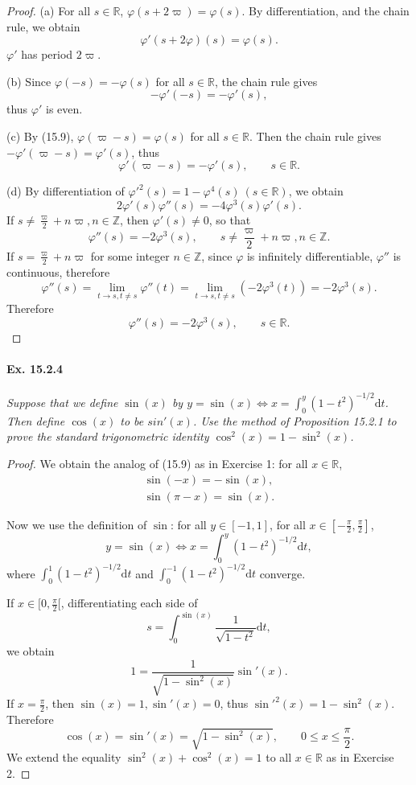 \documentclass[11pt,a4paper]{article}
\newcommand{\D}{\mathrm{d}}
\newcommand{\Z}{\mathbb{Z}}
\newcommand{\R}{\mathbb{R}}
\begin{document}
\begin{proof}
\item[(a)] For all $s \in \R$, $\varphi(s +2 \varpi) = \varphi(s)$. By differentiation, and the chain rule,  we obtain
$$\varphi'(s + 2 \varphi)(s)= \varphi(s).$$
$\varphi'$ has period $2 \varpi$.
\item[(b)] Since $\varphi(-s) = - \varphi(s)$ for all $s \in \R$, the chain rule gives
$$- \varphi'(-s) = - \varphi'(s),$$
thus $\varphi'$ is even.
\item[(c)] By (15.9), $\varphi(\varpi - s) = \varphi(s)$ for all $s \in \R$. Then the chain rule gives $-\varphi'(\varpi -s) = \varphi'(s)$, thus
$$\varphi'(\varpi -s) = -\varphi'(s),\qquad s \in \R.$$
\item[(d)] By differentiation of $\varphi'^2(s) = 1 - \varphi^4(s)\ (s \in \R)$, we obtain
$$2 \varphi'(s) \varphi''(s) = -4 \varphi^3(s) \varphi'(s).$$
If $s \ne \frac{\varpi}{2} + n \varpi, n \in \Z$, then $\varphi'(s) \ne 0$, so that
$$\varphi''(s) = -2 \varphi^3(s),\qquad s \ne \frac{\varpi}{2} + n \varpi, n \in \Z.$$
If $s=\frac{\varpi}{2} + n \varpi $ for some integer $n \in \Z$, since $\varphi$ is infinitely differentiable, $\varphi''$ is continuous, therefore
$$\varphi''(s) = \lim_{t \to s, t\ne s} \varphi''(t) = \lim_{t \to s, t \ne s} (-2 \varphi^3(t)) = -2 \varphi^3(s).$$
Therefore
$$\varphi''(s) = -2 \varphi^3(s),\qquad s \in \R.$$
\end{proof}

\paragraph{Ex. 15.2.4}{\it Suppose that we define $\sin(x)$ by $y = \sin(x) \iff x = \int_0^y(1-t^2)^{-1/2} \D t$. Then define $\cos (x)$ to be $sin'(x)$. Use the method of Proposition 15.2.1 to prove the standard trigonometric identity $\cos^2(x) = 1 - \sin^2(x)$.
}

\begin{proof}
We obtain the analog of (15.9) as in Exercise 1: for all $x \in \R$,
\begin{align*}
\sin(-x) = - \sin(x),\\
\sin(\pi-x) = \sin(x).
\end{align*}

Now we use the definition of $\sin$: for all $y\in [-1,1]$, for all $x \in [-\frac{\pi}{2}, \frac{\pi}{2}]$,
$$y = \sin(x) \iff x = \int_0^y(1-t^2)^{-1/2} \D t,$$
where $\int_0^1(1-t^2)^{-1/2} \D t$ and $ \int_0^{-1}(1-t^2)^{-1/2} \D t$ converge.

If $x \in [0 , \frac{\pi}{2}[$, differentiating each side of
$$s = \int_0^{\sin(x)} \frac{1}{\sqrt{1-t^2}} \D t,$$
we obtain
$$1 = \frac{1}{\sqrt{1 - \sin^2(x)}} \sin'(x).$$
If $x = \frac{\pi}{2}$, then $\sin(x) = 1, \sin'(x) = 0$, thus $\sin'^2(x) = 1 - \sin^2(x)$.
Therefore
$$\cos(x) = \sin'(x) = \sqrt{1 - \sin^2(x)},\qquad 0 \leq x \leq \frac{\pi}{2}.$$
We extend the equality $\sin^2(x) + \cos^2(x) = 1$ to all $x \in \R$ as in Exercise 2.
\end{proof}
\end{document}
